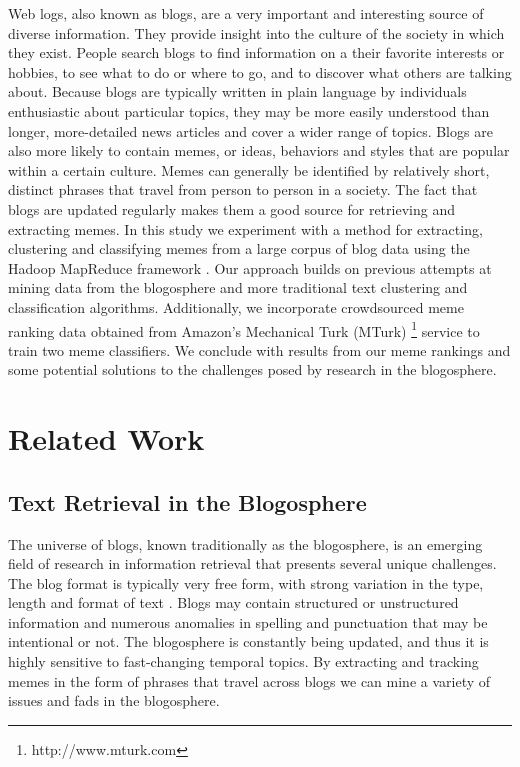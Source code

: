 \documentclass{sig-alternate}
\begin{document}
Web logs, also known as blogs, are a very important and interesting source of diverse information. They provide insight into the culture of the society in which they exist. People search blogs to find information on a their favorite interests or hobbies, to see what to do or where to go, and to discover what others are talking about. Because blogs are typically written in plain language by individuals enthusiastic about particular topics, they may be more easily understood than longer, more-detailed news articles and cover a wider range of topics. Blogs are also more likely to contain memes, or ideas, behaviors and styles that are popular within a certain culture. Memes can generally be identified by relatively short, distinct phrases that travel from person to person in a society. The fact that blogs are updated regularly makes them a good source for retrieving and extracting memes. In this study we experiment with a method for extracting, clustering and classifying memes from a large corpus of blog data using the Hadoop MapReduce framework \cite{Dean2008}. Our approach builds on previous attempts at mining data from the blogosphere and more traditional text clustering and classification algorithms. Additionally, we incorporate crowdsourced meme ranking data obtained from Amazon's Mechanical Turk (MTurk) \footnote{http://www.mturk.com} service to train two meme classifiers. We conclude with results from our meme rankings and some potential solutions to the challenges posed by research in the blogosphere.

\section{Related Work}
\subsection{Text Retrieval in the Blogosphere}
The universe of blogs, known traditionally as the blogosphere, is an emerging field of research in information retrieval that presents several unique challenges. The blog format is typically very free form, with strong variation in the type, length and format of text \cite{Schmidt2007}. Blogs may contain structured or unstructured information and numerous anomalies in spelling and punctuation that may be intentional or not. The blogosphere is constantly being updated, and thus it is highly sensitive to fast-changing temporal topics. By extracting and tracking memes in the form of phrases that travel across blogs we can mine a variety of issues and fads in the blogosphere.
\end{document}

